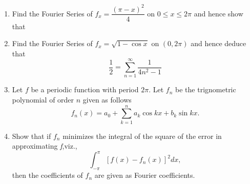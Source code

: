 \documentclass[journal,12pt,twocolumn]{IEEEtran}
\begin{document}
\begin{enumerate}
\begin{enumerate}[(i)]
\setlength\itemsep{2em}
\end{enumerate}

\item Find the Fourier Series of $f_x = {\dfrac{(\pi - x)^2}{4}}$ on $0 \leqslant x \leqslant 2\pi$ and hence show that

\begin{enumerate}[(a)]
\setlength\itemsep{2em}
\end{enumerate} 

\item Find the Fourier Series of 
$f_x = \sqrt{1-\cos x}$ on $(0,2\pi)$ 
and hence deduce that 
\begin{equation*}
\dfrac{1}{2} = \sum_{n=1}^{\infty} {\dfrac{1}{4n^2-1}}
\end{equation*}


\item Let $f$ be a periodic function with period $2\pi$. Let $f_n$ be the trignometric polynomial of order $n$ given as follows \\
{\begin{equation*} 
f_n(x) = a_0 + \sum_{k=1}^{n} a_k \cos kx + b_k\sin kx.
\end{equation*}}


\item Show that if $f_n$ minimizes the integral of the square of the error in approximating \textit{f},viz.,\\
{\begin{equation*}
\int_{-\pi}^{\pi}{[f(x)-f_n(x)]^2}dx, 
\end{equation*}}
then the coefficients of $f_n$ are given as Fourier coefficients.


\end{enumerate}
\end{document}
